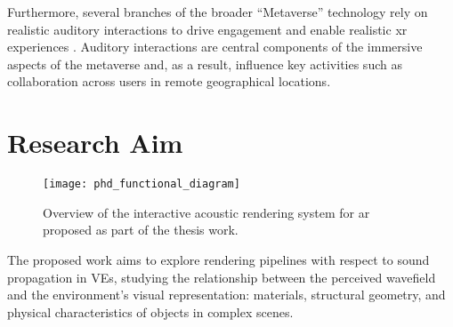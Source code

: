 Furthermore, several branches of the broader ``Metaverse'' technology rely on realistic auditory interactions to drive engagement and enable realistic \acrshort{xr} experiences \citep{park2022metaverse,al2022review}. Auditory interactions are central components of the immersive aspects of the metaverse and, as a result, influence key activities such as collaboration across users in remote geographical locations.\par

\section{Research Aim}
\begin{figure}[htbp]
    \centering
    \texttt{[image: phd\_functional\_diagram]}
    \caption[Proposed pipeline schematic overview]{Overview of the interactive acoustic rendering system for \acrshort{ar} proposed as part of the thesis work.}
    \label{fig:proposed-system-diagram}
\end{figure}
The proposed work aims to explore rendering pipelines with respect to sound propagation in VEs, studying the relationship between the perceived wavefield and the environment’s visual representation: materials, structural geometry, and physical characteristics of objects in complex scenes.


